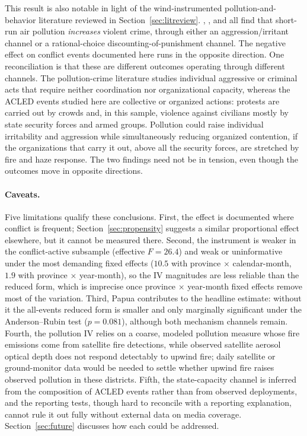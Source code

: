 \documentclass[12pt]{article}
\begin{document}
This result is also notable in light of the wind-instrumented pollution-and-behavior literature reviewed in Section~\ref{sec:litreview}. \citet{herrnstadt2021}, \citet{bondyrothsager2020}, and \citet{burkhardt2019} all find that short-run air pollution \emph{increases} violent crime, through either an aggression/irritant channel or a rational-choice discounting-of-punishment channel. The negative effect on conflict events documented here runs in the opposite direction. One reconciliation is that these are different outcomes operating through different channels. The pollution-crime literature studies individual aggressive or criminal acts that require neither coordination nor organizational capacity, whereas the ACLED events studied here are collective or organized actions: protests are carried out by crowds and, in this sample, violence against civilians mostly by state security forces and armed groups. Pollution could raise individual irritability and aggression while simultaneously reducing organized contention, if the organizations that carry it out, above all the security forces, are stretched by fire and haze response. The two findings need not be in tension, even though the outcomes move in opposite directions.

\paragraph{Caveats.} Five limitations qualify these conclusions. First, the effect is documented where conflict is frequent; Section~\ref{sec:propensity} suggests a similar proportional effect elsewhere, but it cannot be measured there. Second, the instrument is weaker in the conflict-active subsample (effective $F = 26.4$) and weak or uninformative under the most demanding fixed effects ($10.5$ with province $\times$ calendar-month, $1.9$ with province $\times$ year-month), so the IV magnitudes are less reliable than the reduced form, which is imprecise once province $\times$ year-month fixed effects remove most of the variation. Third, Papua contributes to the headline estimate: without it the all-events reduced form is smaller and only marginally significant under the Anderson--Rubin test ($p=0.081$), although both mechanism channels remain. Fourth, the pollution IV relies on a coarse, modeled pollution measure whose fire emissions come from satellite fire detections, while observed satellite aerosol optical depth does not respond detectably to upwind fire; daily satellite or ground-monitor data would be needed to settle whether upwind fire raises observed pollution in these districts. Fifth, the state-capacity channel is inferred from the composition of ACLED events rather than from observed deployments, and the reporting tests, though hard to reconcile with a reporting explanation, cannot rule it out fully without external data on media coverage. Section~\ref{sec:future} discusses how each could be addressed.
\end{document}
